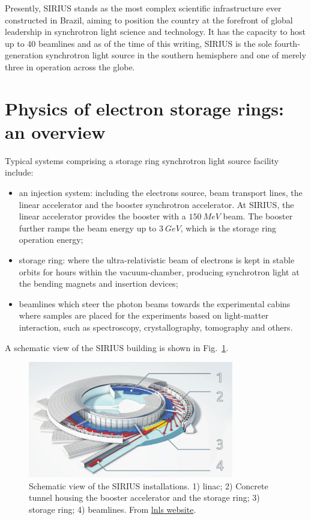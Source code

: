 Presently, SIRIUS stands as the most complex scientific infrastructure ever constructed in Brazil, aiming to position the country at the forefront of global leadership in synchrotron light science and technology. It has the capacity to host up to 40 beamlines and as of the time of this writing, SIRIUS is the sole fourth-generation synchrotron light source in the southern hemisphere and one of merely three  in operation across the globe.

\section*{Physics of electron storage rings: an overview}

Typical systems comprising a storage ring synchrotron light source facility include:
\begin{itemize}
    \item an injection system: including the electrons source, beam transport lines, the linear accelerator and the booster synchrotron accelerator. At SIRIUS, the linear accelerator provides the booster with a $150~\unit{MeV}$ beam. The booster further ramps the beam energy up to $3~\unit{GeV}$, which is the storage ring operation energy;
    \item storage ring: where the ultra-relativistic beam of electrons is kept in stable orbits for hours within the vacuum-chamber, producing synchrotron light at the bending magnets and insertion devices;
    \item beamlines which steer the photon beams towards the experimental cabins where samples are placed for the experiments based on light-matter interaction, such as spectroscopy, crystallography, tomography and others.
\end{itemize}
A schematic view of the SIRIUS building is shown in Fig.~\ref{fig:sirius_layout}.
\begin{figure}[tb]
    \centering
    \includegraphics[width=0.8\textwidth]{Images/sirius_facility.png}
    \caption[Schematic view of the SIRIUS installations.]{Schematic view of the SIRIUS installations. 1) \gls*{linac}; 2) Concrete tunnel housing the booster accelerator and the storage ring; 3) storage ring; 4) beamlines. From \href{https://lnls.cnpem.br/sirius/como-funciona-o-sirius/}{\gls*{lnls} website}.}
    \label{fig:sirius_layout}
\end{figure}

